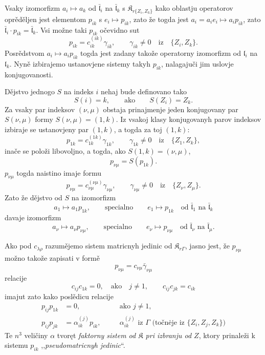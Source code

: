 \documentclass[11pt]{article}
\begin{document}
Vsaky izomorfizm \(a_i\mapsto a_k\) od \(\bar{\mathfrak l}_i\) na \(\bar{\mathfrak l}_k\) s \(\mathfrak K_{r\{Z_i,Z_k\}}\) kako oblastju operatorov oprěděljen jest elementom \(p_{ik}\) s \(e_i\mapsto p_{ik}\), zato že togda jest \(a_i=a_ie_i\mapsto a_ip_{ik}\), zato \(\bar{\mathfrak l}_i\cdot p_{ik}=\bar{\mathfrak l}_k\). Vsi možne taki \(p_{ik}\) očevidno sut
\[
p_{ik}=c_{ik}^{(ik)}\gamma_{ik},\qquad \gamma_{ik}\ne0\quad\text{iz}\quad \{Z_i,Z_k\}.
\]
Posrědstvom \(a_i\mapsto a_ip_{ik}\) togda jest zadany takože operatorny izomorfizm od \(\mathfrak l_i\) na \(\mathfrak l_k\). Nyně izbirajemo ustanovjene sistemy takyh \(p_{ik}\), nalagajuči jim uslovje konjugovanosti.

Dějstvo jednogo \(S\) na indeks \(i\) nehaj bude definovano tako
\[
S(i)=k,\qquad\text{ako}\qquad S(Z_i)=Z_k.
\]
Za vsaky par indeksov \((\nu,\mu)\) obstaja prinajmenje jeden konjugovany par \(S(\nu,\mu)\) formy \(S(\nu,\mu)=(1,k)\). Iz vsakoj klasy konjugovanyh parov indeksov izbiraje se ustanovjeny par \((1,k)\), a togda za toj \((1,k)\):
\[
p_{1k}=c_{1k}^{(1k)}\gamma_{1k},\qquad \gamma_{1k}\ne0\quad\text{iz}\quad \{Z_1,Z_k\},
\]
inače se položi libovoljno, a togda, ako \(S(1,k)=(\nu,\mu)\),
\[
p_{\nu\mu}=S(p_{1k}).
\]
\(p_{\nu\mu}\) togda naistino imaje formu
\[
p_{\nu\mu}=c_{\nu\mu}^{(\nu\mu)}\gamma_{\nu\mu},\qquad
\gamma_{\nu\mu}\ne0\quad\text{iz}\quad \{Z_\nu,Z_\mu\}.
\]
Zato že dějstvo od \(S\) na izomorfizm
\[
a_1\mapsto a_1p_{1k},\qquad\text{specialno}\qquad e_1\mapsto p_{1k}
\quad\text{od }\bar{\mathfrak l}_1\text{ na }\bar{\mathfrak l}_k
\]
davaje izomorfizm
\[
a_\nu\mapsto a_\nu p_{\nu\mu},\qquad\text{specialno}\qquad e_\nu\mapsto p_{\nu\mu}
\quad\text{od }\bar{\mathfrak l}_\nu\text{ na }\bar{\mathfrak l}_\mu.
\]

Ako pod \(c_{\lambda\rho}\) razumějemo sistem matricnyh jedinic od \(\mathfrak K_{r\Gamma}\), jasno jest, že \(p_{\nu\mu}\) možno takože zapisati v formě
\[
p_{\nu\mu}=c_{\nu\mu}\bar\gamma_{\nu\mu}
\]
relacije
\[
c_{ij}c_{1k}=0,\quad\text{ako}\quad j\ne1,
\qquad
c_{ij}c_{jk}=c_{ik}
\]
imajut zato kako poslědicu relacije
\[
\begin{aligned}
p_{ij}p_{1k}&=0,\quad &&\text{ako }j\ne1,\\
p_{ij}p_{jk}&=\alpha_{ik}^{(j)}p_{ik},\quad
&&\alpha_{ik}^{(j)}\text{ iz }\Gamma\text{ (točnėje iz }\{Z_i,Z_j,Z_k\}\text{)}
\end{aligned}
\]
Te \(n^3\) veličiny \(\alpha\) tvoręt \emph{faktorny sistem od \(\mathfrak K\) pri izbranju od \(Z\)}, ktory prinaleži k sistemu \(p_{ik}\) ,,\emph{pseudomatricnyh jedinic}``.
\end{document}
